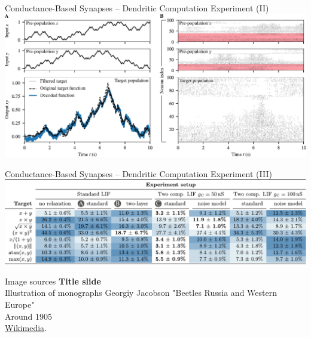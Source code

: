 \documentclass[handout,aspectratio=169]{beamer}
\begin{document}
	\begin{frame}{Conductance-Based Synapses -- Dendritic Computation Experiment (II)}
		\centering
		\includegraphics[width=\textwidth]{media/results_example.pdf}
	\end{frame}

	\begin{frame}{Conductance-Based Synapses -- Dendritic Computation Experiment (III)}
		\centering
		\includegraphics[width=\textwidth]{media/result_table.pdf}
	\end{frame}

	\backupbegin

	\begin{frame}[noframenumbering]{Image sources}
		\small
		\textbf{Title slide}\\Illustration of monographs Georgiy Jacobson "Beetles Russia and Western Europe"\\Around 1905\\ \href{https://commons.wikimedia.org/wiki/File:Jacobs24.jpg}{Wikimedia}.
	\end{frame}

	\backupend
	
\end{document}
